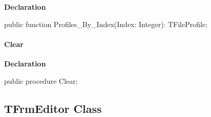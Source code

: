 \documentclass{report}
\newif\ifpdf
\begin{document}
\label{editor.TFileProfiles-Profiles_By_Index}
\begin{list}{}{
\setlength{\itemindent}{0cm}
\setlength{\listparindent}{0cm}
\setlength{\leftmargin}{\evensidemargin}
\addtolength{\leftmargin}{\tmplength}
\settowidth{\labelsep}{X}
\addtolength{\leftmargin}{\labelsep}
\setlength{\labelwidth}{\tmplength}
}
\item[\textbf{Declaration}\hfill]
\ifpdf
\begin{flushleft}
\fi
\begin{ttfamily}
public function Profiles{\_}By{\_}Index(Index: Integer): TFileProfile;\end{ttfamily}

\ifpdf
\end{flushleft}
\fi

\end{list}
\paragraph*{Clear}\hspace*{\fill}

\label{editor.TFileProfiles-Clear}
\begin{list}{}{
\setlength{\itemindent}{0cm}
\setlength{\listparindent}{0cm}
\setlength{\leftmargin}{\evensidemargin}
\addtolength{\leftmargin}{\tmplength}
\settowidth{\labelsep}{X}
\addtolength{\leftmargin}{\labelsep}
\setlength{\labelwidth}{\tmplength}
}
\item[\textbf{Declaration}\hfill]
\ifpdf
\begin{flushleft}
\fi
\begin{ttfamily}
public procedure Clear;\end{ttfamily}

\ifpdf
\end{flushleft}
\fi

\end{list}
\ifpdf
\subsection*{\large{\textbf{TFrmEditor Class}}\normalsize\hspace{1ex}\hrulefill}
\else
\subsection*{TFrmEditor Class}
\fi
\label{editor.TFrmEditor}
\end{document}
